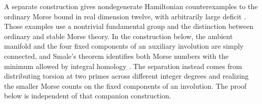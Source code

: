 A separate construction gives nondegenerate Hamiltonian counterexamples to the ordinary Morse bound in real dimension twelve, with arbitrarily large deficit \cite[Theorem~1.1 and Corollary~1.2]{OpenAI2026Morse}. Those examples use a nontrivial fundamental group and the distinction between ordinary and stable Morse theory. In the construction below, the ambient manifold and the four fixed components of an auxiliary involution are simply connected, and Smale's theorem identifies both Morse numbers with the minimum allowed by integral homology \cite[Theorem~2.4]{Smale1963}. The separation instead comes from distributing torsion at two primes across different integer degrees and realizing the smaller Morse counts on the fixed components of an involution. The proof below is independent of that companion construction.
